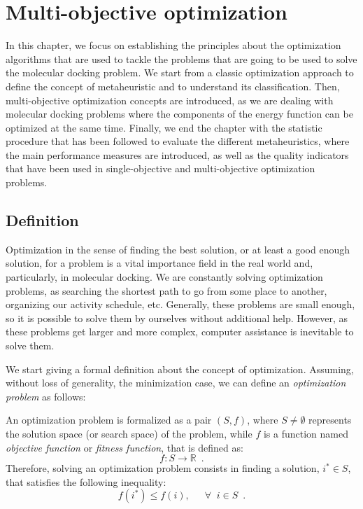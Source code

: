 \chapter{Multi-objective optimization}
\label{chapter:metaheuristcs}

In this chapter, we focus on establishing the principles about the optimization algorithms that are used to tackle the problems that are going to be used to solve the molecular docking problem. We start from a classic optimization approach to define the concept of metaheuristic and to understand its classification. Then, multi-objective optimization concepts are introduced, as we are dealing with molecular docking problems where the components of the energy function can be optimized at the same time. Finally, we end the chapter with the statistic procedure that has been followed to evaluate the different metaheuristics, where the main performance measures are introduced, as well as the quality indicators that have been used in single-objective and multi-objective optimization problems.

\section{Definition}

Optimization in the sense of finding the best solution, or at least a good enough solution, for a problem is a  vital importance field in the real world and, particularly, in molecular docking. We are constantly solving optimization problems, as searching the shortest path to go from some place to another, organizing our activity schedule, etc. Generally, these problems are small enough, so it is possible to solve them by ourselves without additional help. However, as these problems get larger and more complex, computer assistance is inevitable to solve them.

We start giving a formal definition about the concept of optimization. Assuming, without loss of generality, the minimization case, we can define an \emph{optimization problem} as follows:

\begin{definition}
	\label{def:OptimizationProblem} An optimization problem is formalized as a pair $(S,f)$, where $S\neq \emptyset$ represents the solution space (or search space) of the problem, while $f$ is a function named \emph{objective function} or \emph{fitness function}, that is defined as:
	\begin{equation}
		f:S\rightarrow \mathbb{R} \enspace .
	\end{equation}
	Therefore, solving an optimization problem consists in finding a solution, $i^\ast \in S$, that satisfies the following inequality:
	\begin{equation}
	f(i^\ast) \leq f(i), \enspace \enspace \enspace \forall \;\; i\in S \enspace.
	\end{equation}
\end{definition}

